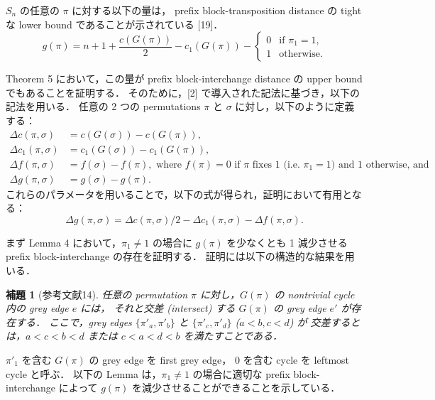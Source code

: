 \documentclass[paper=a4,fontsize=11pt,report,oneside]{jlreq}
\newtheorem{lemma}[theorem]{補題}
\begin{document}
$S_n$ の任意の $\pi$ に対する以下の量は，
prefix block-transposition distance の tight な lower bound であることが示されている [19]．
\begin{equation}
    g(\pi) = n + 1 + \frac{c(G(\pi))}{2} - c_1(G(\pi)) -
    \begin{cases}
        0 & \text{if } \pi_1 = 1, \\
        1 & \text{otherwise}.
    \end{cases}
    \label{eq:g_pi}
\end{equation}

Theorem 5 において，この量が prefix block-interchange distance の upper bound でもあることを証明する．
そのために，[2] で導入された記法に基づき，以下の記法を用いる．
任意の 2 つの permutations $\pi$ と $\sigma$ に対し，以下のように定義する：
\begin{align*}
    \Delta c(\pi, \sigma) &= c(G(\sigma)) - c(G(\pi)), \\
    \Delta c_1(\pi, \sigma) &= c_1(G(\sigma)) - c_1(G(\pi)), \\
    \Delta f(\pi, \sigma) &= f(\sigma) - f(\pi), \text{ where } f(\pi) = 0 \text{ if } \pi \text{ fixes } 1 \text{ (i.e. } \pi_1 = 1\text{) and } 1 \text{ otherwise, and} \\
    \Delta g(\pi, \sigma) &= g(\sigma) - g(\pi).
\end{align*}
これらのパラメータを用いることで，以下の式が得られ，証明において有用となる：
\begin{equation}
    \Delta g(\pi, \sigma) = \Delta c(\pi, \sigma)/2 - \Delta c_1(\pi, \sigma) - \Delta f(\pi, \sigma).
    \label{eq:delta_g}
\end{equation}

まず Lemma 4 において，$\pi_1 \neq 1$ の場合に $g(\pi)$ を少なくとも 1 減少させる
prefix block-interchange の存在を証明する．
証明には以下の構造的な結果を用いる．

\begin{lemma}[参考文献14] \label{lem:intersect}
    任意の permutation $\pi$ に対し，$G(\pi)$ の nontrivial cycle 内の grey edge $e$ には，
    それと交差 (intersect) する $G(\pi)$ の grey edge $e'$ が存在する．
    ここで，grey edges $\{\pi'_a, \pi'_b\}$ と $\{\pi'_c, \pi'_d\}$ ($a < b, c < d$) が
    交差するとは，$a < c < b < d$ または $c < a < d < b$ を満たすことである．
\end{lemma}

$\pi'_1$ を含む $G(\pi)$ の grey edge を first grey edge，
0 を含む cycle を leftmost cycle と呼ぶ．
以下の Lemma は，$\pi_1 \neq 1$ の場合に適切な prefix block-interchange によって
$g(\pi)$ を減少させることができることを示している．
\end{document}

